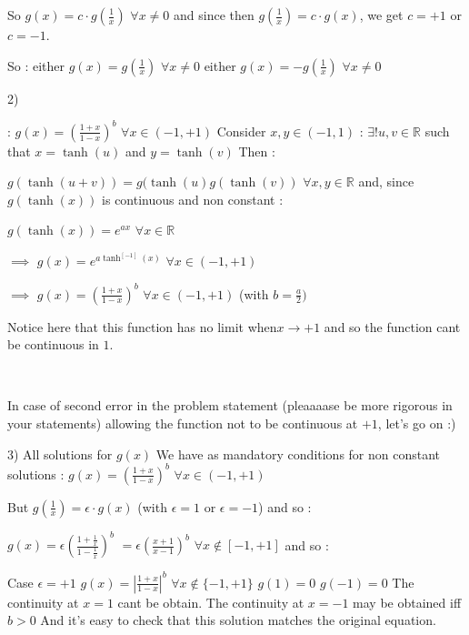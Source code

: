 \begin{solution}
So $ g(x)=c\cdot g(\frac{1}{x})$ $ \forall x\neq 0$ and since then $ g(\frac{1}{x})=c\cdot g(x)$, we get $ c=+1$ or $ c=-1$.

So :
either $ g(x)=g(\frac{1}{x})$ $ \forall x\neq 0$
either $ g(x)=-g(\frac{1}{x})$ $ \forall x\neq 0$


2)  : $ g(x)=\left(\frac{1+x}{1-x}\right)^b$ $ \forall x\in(-1,+1)$
Consider $ x,y\in(-1,1)$ : $ \exists! u,v\in\mathbb R$ such that $ x=\tanh(u)$ and $ y=\tanh(v)$ Then :

$ g(\tanh(u+v))=g(\tanh(u)g(\tanh(v))$ $ \forall x,y\in \mathbb R$ and, since $ g(\tanh(x))$ is continuous and non constant : 

$ g(\tanh(x))=e^{ax}$ $ \forall x\in\mathbb R$

$ \implies$ $ g(x)=e^{a\tanh^{[-1]}(x)}$ $ \forall x\in(-1,+1)$

$ \implies$ $ g(x)=\left(\frac{1+x}{1-x}\right)^b$ $ \forall x\in(-1,+1)$ (with $ b=\frac{a}{2})$

Notice here that this function has no limit when$ x\to +1$ and so the function cant be continuous in $ 1$.



In case of second error in the problem statement (pleaaaase be more rigorous in your statements) allowing the function not to be continuous at $ +1$, let's go on :)

3) All solutions for $ g(x)$
We have as mandatory conditions for non constant solutions :
$ g(x)=\left(\frac{1+x}{1-x}\right)^b$ $ \forall x\in(-1,+1)$

But $ g(\frac{1}{x})=\epsilon\cdot g(x)$ (with $ \epsilon=1$ or $ \epsilon=-1$) and so :

$ g(x)=\epsilon\left(\frac{1+\frac{1}{x}}{1-\frac{1}{x}}\right)^b$ $ =\epsilon\left(\frac{x+1}{x-1}\right)^b$ $ \forall x\notin[-1,+1]$ and so :

Case $ \epsilon=+1$
$ g(x)=\left|\frac{1+x}{1-x}\right|^b$ $ \forall x\notin\{-1,+1\}$
$ g(1)=0$
$ g(-1)=0$
The continuity at $ x=1$ cant be obtain.
The continuity at $ x=-1$ may be obtained iff $ b>0$
And it's easy to check that this solution matches the original equation.


\end{solution}
